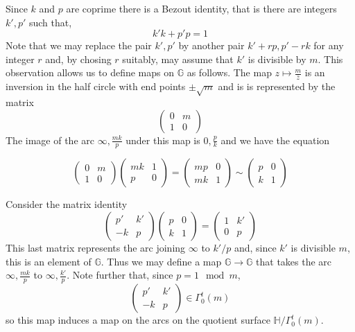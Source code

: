 \documentclass[12pt,a4paper]{amsart}
\def\GG{\mathbb{G}}
\begin{document}
Since $k$ and $p$ are coprime there is a Bezout identity,
that is there are integers $k',p'$ such that,
$$k'k + p'p = 1$$
Note that we may replace the pair $k',p'$
by another pair $k'+ rp, p' -rk$ for any integer $r$
and, by chosing $r$ suitably,
may assume that $k'$ is divisible by $m$.
This observation allows us to define maps on $\GG$ as follows.
The map 
$z\mapsto \frac{m}{\bar{z}}$ is an inversion in the half circle
with end points $\pm\sqrt{m}$  and is 
is represented by the matrix
$$
\begin{pmatrix}
	0 & m \\ 1 & 0
\end{pmatrix}
$$
The image of the arc $\infty,\frac{mk}{p}$
under this map is $0, \frac{p}{k}$
and we have the equation

\begin{equation}
\begin{pmatrix}
	0 & m \\ 1 & 0
\end{pmatrix}
\begin{pmatrix}
mk & 1 \\
p & 0
\end{pmatrix}
= 
\begin{pmatrix}
mp & 0 \\
mk  & 1
\end{pmatrix}
\sim
\begin{pmatrix}
p & 0 \\
k & 1
\end{pmatrix}
\end{equation}

Consider the matrix identity
\begin{equation}
\begin{pmatrix}
p' & k' \\
-k & p
\end{pmatrix}
\begin{pmatrix}
p & 0 \\
k & 1
\end{pmatrix}
= 
\begin{pmatrix}
1 & k' \\
0  & p
\end{pmatrix}
\end{equation}
This last matrix represents 
the arc joining $\infty$ to $k'/p$ 
and, since $k'$ is divisible $m$,
this is an element of $\GG$.
Thus we may define a map $\GG  \rightarrow \GG $ that takes the arc $\infty, \frac{mk}{p}$ to $\infty,
	\frac{k'}{p}$.
Note further that, 
since $ p =  1 \mod m$,
$$
\begin{pmatrix}
p' & k' \\
-k & p
\end{pmatrix}
\in \Gamma^t _0(m)$$
so this map induces a map on the arcs on the quotient surface
$\mathbb{H}/\Gamma^t_0(m)$.
\end{document}

